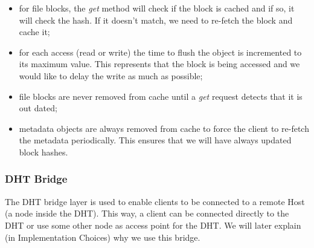 \documentclass[times,9pt,article]{llncs}
\begin{document}
\begin{itemize}
\item for file blocks, the \emph{get} method will check if the block is cached and if so, it will check the hash. If it doesn't match, we need to re-fetch the block and cache it;
\item for each access (read or write) the time to flush the object is incremented to its maximum value. This represents that the block is being accessed and we would like to delay the write as much as possible;
\item file blocks are never removed from cache until a \emph{get} request detects that it is out dated;
\item metadata objects are always removed from cache to force the client to re-fetch the metadata periodically. This ensures that we will have always updated block hashes.
\end{itemize}

\subsubsection{DHT Bridge}

The DHT bridge layer is used to enable clients to be connected to a remote Host (a node inside the DHT). This way, a client can be connected directly to the DHT or use some other node as access point for the DHT. We will later explain (in Implementation Choices) why we use this bridge.
\end{document}
